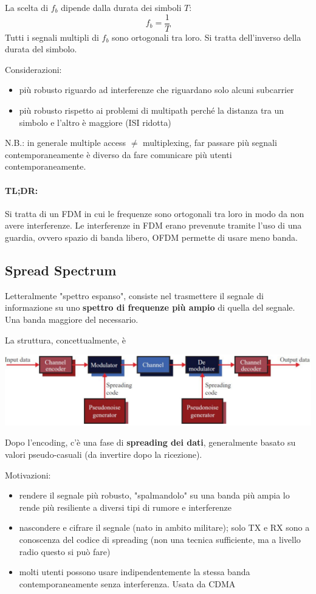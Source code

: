 La scelta di $f_b$ dipende dalla durata dei simboli $T$:
$$ f_b = \frac{1}{T}$$
Tutti i segnali multipli di $f_b$ sono ortogonali tra loro. Si tratta dell'inverso della durata del simbolo.

Considerazioni:
\begin{itemize}
	\item più robusto riguardo ad interferenze che riguardano solo alcuni subcarrier
	\item più robusto rispetto ai problemi di multipath perché la distanza tra un simbolo e l'altro è maggiore (ISI ridotta)
\end{itemize}

N.B.: in generale multiple access $\neq$ multiplexing, far passare più segnali contemporaneamente è diverso da fare comunicare più utenti contemporaneamente.

\paragraph{TL;DR: } Si tratta di un FDM in cui le frequenze sono ortogonali tra loro in modo da non avere interferenze. Le interferenze in FDM erano prevenute tramite l'uso di una guardia, ovvero spazio di banda libero, OFDM permette di usare meno banda.

\subsection{Spread Spectrum}
Letteralmente "spettro espanso", consiste nel trasmettere il segnale di informazione su uno \textbf{spettro di frequenze più ampio} di quella del segnale. Una banda maggiore del necessario. 

La struttura, concettualmente, è
\begin{center}
	\includegraphics[width=0.95\linewidth]{img/wireless/ss1}
\end{center}
Dopo l'encoding, c'è una fase di \textbf{spreading dei dati}, generalmente basato su valori pseudo-casuali (da invertire dopo la ricezione).

Motivazioni:
\begin{itemize}
	\item rendere il segnale più robusto, "spalmandolo" su una banda più ampia lo rende più resiliente a diversi tipi di rumore e interferenze
	\item nascondere e cifrare il segnale (nato in ambito militare); solo TX e RX sono a conoscenza del codice di spreading (non una tecnica sufficiente, ma a livello radio questo si può fare)
	\item molti utenti possono usare indipendentemente la stessa banda contemporaneamente senza interferenza. Usata da CDMA
\end{itemize}

